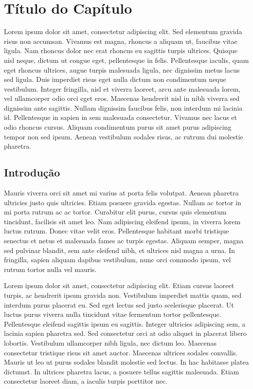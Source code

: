%

\chapter{Título do Capítulo}

Lorem ipsum dolor sit amet, consectetur adipiscing elit. Sed elementum
gravida risus non accumsan. Vivamus est magna, rhoncus a aliquam ut,
faucibus vitae ligula. Nam rhoncus dolor nec erat rhoncus eu sagittis
turpis ultrices. Quisque nisl neque, dictum ut congue eget, pellentesque
in felis. Pellentesque iaculis, quam eget rhoncus ultrices, augue
turpis malesuada ligula, nec dignissim metus lacus sed ligula. Duis
imperdiet risus eget nulla dictum non condimentum neque vestibulum.
Integer fringilla, nisl et viverra laoreet, arcu ante malesuada lorem,
vel ullamcorper odio orci eget eros. Maecenas hendrerit nisl in nibh
viverra sed dignissim ante sagittis. Nullam dignissim faucibus felis,
non interdum mi lacinia id. Pellentesque in sapien in sem malesuada
consectetur. Vivamus nec lacus et odio rhoncus cursus. Aliquam condimentum
purus sit amet purus adipiscing tempor non sed ipsum. Aenean vestibulum
sodales risus, ac rutrum dui molestie pharetra. 

\section{Introdução}

Mauris viverra orci sit amet \cite{article:dummy} mi varius at porta
felis volutpat. Aenean pharetra ultricies justo quis ultricies. Etiam
posuere gravida egestas. Nullam ac tortor in mi porta rutrum ac ac
tortor. Curabitur elit purus, cursus quis elementum tincidunt, facilisis
sit amet leo. Nam adipiscing eleifend ipsum, in viverra lorem luctus
rutrum. Donec vitae velit eros. Pellentesque habitant morbi tristique
senectus et netus et malesuada fames ac turpis egestas. Aliquam semper,
magna sed pulvinar blandit, sem ante eleifend nibh, et ultrices nisl
magna a urna. In fringilla, sapien aliquam dapibus vestibulum, nunc
orci commodo ipsum, vel rutrum tortor nulla vel mauris.

Lorem ipsum dolor sit amet, consectetur adipiscing elit. Etiam cursus
laoreet turpis, ac hendrerit ipsum gravida non. Vestibulum imperdiet
mattis quam, sed interdum purus placerat eu. Sed eget lectus sed justo
scelerisque placerat. Ut luctus purus viverra nulla tincidunt vitae
fermentum tortor pellentesque. Pellentesque eleifend sagittis ipsum
eu sagittis. Integer ultricies adipiscing sem, a lacinia sapien pharetra
sed. Sed consectetur orci at odio aliquet in placerat libero lobortis.
Vestibulum ullamcorper nibh ligula, nec dictum leo. Maecenas consectetur
tristique risus sit amet auctor. Maecenas ultrices sodales convallis.
Mauris ut leo ut purus sodales blandit molestie sed lectus. In hac
habitasse platea dictumst. In ultrices pharetra lacus, a posuere tellus
sagittis malesuada. Etiam consectetur laoreet diam, a iaculis turpis
porttitor nec.

